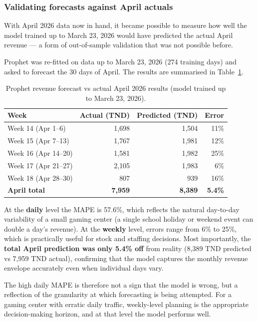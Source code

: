 \documentclass[12pt, a4paper]{report}
\begin{document}
\subsubsection*{Validating forecasts against April actuals}

With April 2026 data now in hand, it became possible to measure how well the
model trained up to March 23, 2026 would have predicted the actual April
revenue --- a form of out-of-sample validation that was not possible before.

Prophet was re-fitted on data up to March 23, 2026 (274 training days) and
asked to forecast the 30 days of April. The results are summarised in
Table~\ref{tab:april_validation}.

\begin{table}[H]
  \centering
  \caption{Prophet revenue forecast vs actual April 2026 results (model trained
           up to March 23, 2026).\label{tab:april_validation}}
  \begin{tabular}{lrrr}
    \toprule
    \textbf{Week} & \textbf{Actual (TND)} & \textbf{Predicted (TND)} & \textbf{Error} \\
    \midrule
    Week 14 (Apr 1--6)   & 1{,}698 & 1{,}504 & 11\% \\
    Week 15 (Apr 7--13)  & 1{,}767 & 1{,}981 & 12\% \\
    Week 16 (Apr 14--20) & 1{,}581 & 1{,}982 & 25\% \\
    Week 17 (Apr 21--27) & 2{,}105 & 1{,}983 &  6\% \\
    Week 18 (Apr 28--30) &   807   &   939   & 16\% \\
    \midrule
    \textbf{April total} & \textbf{7{,}959} & \textbf{8{,}389} & \textbf{5.4\%} \\
    \bottomrule
  \end{tabular}
\end{table}

At the \textbf{daily} level the MAPE is 57.6\%, which reflects the natural
day-to-day variability of a small gaming center (a single school holiday or
weekend event can double a day's revenue). At the \textbf{weekly} level,
errors range from 6\% to 25\%, which is practically useful for stock and
staffing decisions. Most importantly, the \textbf{total April prediction was
only 5.4\% off} from reality (8{,}389 TND predicted vs 7{,}959 TND actual),
confirming that the model captures the monthly revenue envelope accurately
even when individual days vary.

The high daily MAPE is therefore not a sign that the model is wrong, but a
reflection of the granularity at which forecasting is being attempted.
For a gaming center with erratic daily traffic, weekly-level planning is the
appropriate decision-making horizon, and at that level the model performs well.
\end{document}
